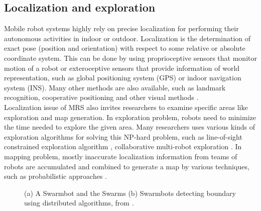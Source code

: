 \subsection*{Localization and exploration}
\label{bg:mrs:loc}
Mobile robot systems highly rely on precise localization for performing their autonomous activities in indoor or outdoor. Localization is the determination of exact pose (position and orientation) with respect to some relative or absolute coordinate system. This can be done by using proprioceptive sensors that monitor motion of a robot or exteroceptive sensors that provide information of world representation, such as global positioning system (GPS) or indoor navigation system (INS). Many other methods are also available, such as landmark recognition, cooperative positioning and other visual methods \cite{Arkin+2002}.\\
Localization issue of MRS also invites researchers to examine specific areas like exploration and map generation. In exploration problem, robots need to minimize the time needed to explore the given area. Many researchers uses various kinds of exploration algorithms for solving this NP-hard problem, such as line-of-sight constrained exploration algorithm , collaborative multi-robot exploration \cite{Burgard+2000}. In mapping problem, mostly inaccurate localization information from teams of robots are accumulated and combined to generate a map by various techniques, such as probabilistic approaches \cite{Thurn+2000}.
\begin{figure}
\centering
{} 
\hspace{0.25cm}
\caption{ (a) A Swarmbot and the Swarms 
 (b) Swarmbots detecting boundary using distributed algorithms, from \protect{}.}
\label{fig:swarmbot-boundary-detection}
\end{figure}
